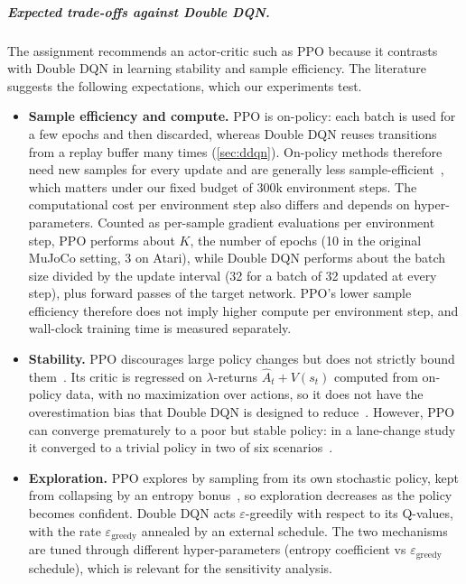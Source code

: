 \subparagraph{Expected trade-offs against Double DQN.}
The assignment recommends an actor-critic such as PPO because it contrasts with Double DQN in learning stability and
sample efficiency. The literature suggests the following expectations, which our experiments test.
\begin{itemize}
  \item \textbf{Sample efficiency and compute.} PPO is on-policy: each batch is used for a few epochs and then
  discarded, whereas Double DQN reuses transitions from a replay buffer many times (\cref{sec:ddqn}). On-policy methods
  therefore need new samples for every update and are generally less sample-efficient~\cite{haarnoja2018sac}, which
  matters under our fixed budget of 300k environment steps. The computational cost per environment step also differs
  and depends on hyper-parameters. Counted as per-sample gradient evaluations per environment step, PPO performs about
  $K$, the number of epochs (10 in the original MuJoCo setting, 3 on Atari), while Double DQN performs about the batch
  size divided by the update interval (32 for a batch of 32 updated at every step), plus forward passes of the target
  network. PPO's lower sample
  efficiency therefore does not imply higher compute per environment step, and wall-clock training time is measured
  separately.
  \item \textbf{Stability.} PPO discourages large policy changes but does not strictly bound
  them~\cite{engstrom2020implementation}. Its critic is regressed on $\lambda$-returns $\hat{A}_t + V(s_t)$ computed
  from on-policy data, with no maximization over actions, so it does not have the overestimation bias that Double DQN
  is designed to reduce~\cite{vanhasselt2016ddqn}. However, PPO can converge prematurely to a poor but stable policy:
  in a lane-change study it converged to a trivial policy in two of six scenarios~\cite{sun2024lanechange}.
  \item \textbf{Exploration.} PPO explores by sampling from its own stochastic policy, kept from collapsing by an
  entropy bonus~\cite{mnih2016a3c,schulman2017ppo}, so exploration decreases as the policy becomes confident. Double
  DQN acts $\varepsilon$-greedily with respect to its Q-values, with the rate $\varepsilon_{\mathrm{greedy}}$ annealed by
  an external schedule. The two mechanisms are tuned through different hyper-parameters (entropy coefficient vs
  $\varepsilon_{\mathrm{greedy}}$ schedule), which is relevant for the sensitivity analysis.
\end{itemize}

